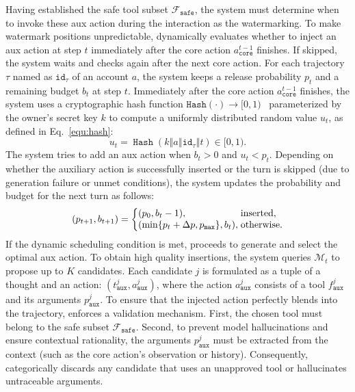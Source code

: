  Having established the safe tool subset $\mathcal{F}_{\mathtt{safe}}$, the system must determine when to invoke these aux action during the interaction as the watermarking. To make watermark positions unpredictable, \name{} dynamically evaluates whether to inject an aux action at step $t$ immediately after the core action $a_{\mathtt{core}}^{t-1}$ finishes. If skipped, the system waits and checks again after the next core action. For each trajectory $\tau$ named as $\mathtt{id}_\tau$ of an account $a$, the system keeps a release probability $p_t$ and a remaining budget $b_t$ at step $t$. Immediately after the core action $a_{\mathtt{core}}^{t-1}$ finishes, the system uses a cryptographic hash function $\mathtt{Hash}(\cdot) \to [0,1)$~\cite{preneel1994cryptographic} parameterized by the owner's secret key $k$ to compute a uniformly distributed random value $u_t$, as defined in Eq.~\ref{equ:hash}:
\begin{equation}
    \label{equ:hash}
u_t = \operatorname{\mathtt{Hash}}(k \mathbin\Vert a \mathbin\Vert \mathtt{id}_\tau \mathbin\Vert t) \in [0, 1).
\end{equation}
The system tries to add an aux action when $b_t>0$ and $u_t<p_t$. Depending on whether the auxiliary action is successfully inserted or the turn is skipped (due to generation failure or unmet conditions), the system updates the probability and budget for the next turn as follows:
\begin{equation}
\label{equ:pb_update}
(p_{t+1},b_{t+1})=
\left\{
\begin{array}{@{}l@{\;}l@{}}
(p_0,b_t-1), & \text{inserted},\\
(\min\{p_t+\Delta p,p_{\mathtt{max}}\},b_t),
& \text{otherwise}.
\end{array}
\right.
\end{equation}
 If the dynamic scheduling condition is met, \name{} proceeds to generate and select the optimal aux action. To obtain high quality insertions, the system queries $\mathcal{M}_t$ to propose up to $K$ candidates. Each candidate $j$ is formulated as a tuple of a thought and an action: $(t_{\mathtt{aux}}^j, a_{\mathtt{aux}}^j)$, where the action $a_{\mathtt{aux}}^j$ consists of a tool $f_{\mathtt{aux}}^j$ and its arguments $p_{\mathtt{aux}}^j$. To ensure that the injected action perfectly blends into the trajectory, \name{} enforces a validation mechanism. First, the chosen tool must belong to the safe subset $\mathcal{F}_{\mathtt{safe}}$. Second, to prevent model hallucinations and ensure contextual rationality, the arguments $p_{\mathtt{aux}}^j$ must be extracted from the context (such as the core action's observation or history). Consequently, \name{} categorically discards any candidate that uses an unapproved tool or hallucinates untraceable arguments.

